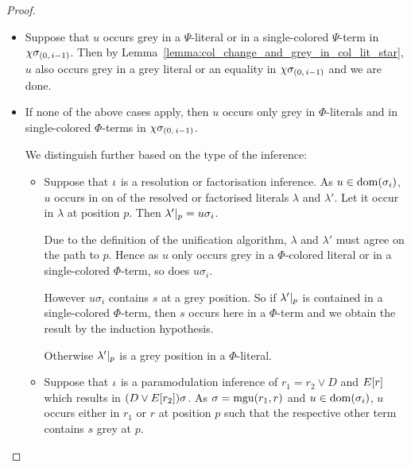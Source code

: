 \documentclass[,%
	draft=false,%
	numbers=noendperiod
	12pt,
	a4paper,
	oneside,%
	openany,
]{memoir}
\newcommand{\inv}{\ensuremath{\chi}}
\begin{document}
\begin{proof}
\begin{itemize}
\begin{itemize}
			\item Suppose that $u$ occurs grey in a $\Psi$-literal or in a single-colored $\Psi$-term in $\inv\sigmazmi$.
				Then by Lemma~\ref{lemma:col_change_and_grey_in_col_lit_star}, $u$ also occurs grey in a grey literal or an equality in $\inv\sigmazmi$ and we are done.


			\item If none of the above cases apply, then $u$ occurs only grey in $\Phi$-literals and in single-colored $\Phi$-terms in $\inv\sigmazmi$.


				We distinguish further based on the type of the inference:

				\begin{itemize}
					\item Suppose that $\iota$ is a resolution or factorisation inference. 
						As $u \in \operatorname{dom}(\sigma_i)$, $u$ occurs in on of the resolved or factorised literals $\lambda$ and $\lambda'$. Let it occur in $\lambda$ at position $p$.
						Then $\lambda'|_{p} = u\sigma_i$. 

						Due to the definition of the unification algorithm, $\lambda$ and $\lambda'$ must agree on the path to $p$.
						Hence as $u$ only occurs grey in a $\Phi$-colored literal or in a single-colored $\Phi$-term, so does $u\sigma_i$.

						However $u\sigma_i$ contains $s$ at a grey position.
						So if $\lambda'|_{p}$ is contained in a single-colored $\Phi$-term, then $s$ occurs here in a $\Phi$-term and we obtain the result by the induction hypothesis.

						Otherwise $\lambda'|_{p}$ is a grey position in a $\Phi$-literal.
						\mytodo{}

					\item Suppose that $\iota$ is a paramodulation inference of $r_1 = r_2 \lor D$ and $E[r]$ which results in $(D \lor E[r_2])\sigma$.
						As $\sigma = \operatorname{mgu}(r_1, r)$ and $u \in \operatorname{dom}(\sigma_i)$, $u$ occurs either in $r_1$ or $r$ at position $p$ such that the respective other term contains $s$ grey at $p$.

						\mytodo{}




\end{itemize}
\end{itemize}
\end{itemize}
\end{proof}
\end{document}
